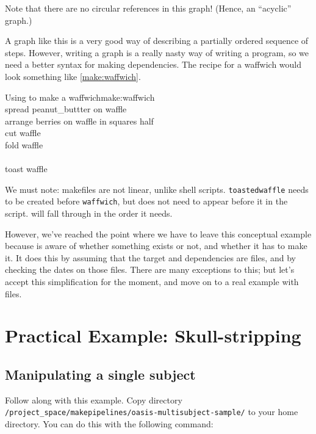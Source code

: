 Note that there are no circular references in this graph! (Hence, an ``acyclic'' graph.)

A graph like this is a very good way of describing a partially ordered sequence of steps.  However, writing a graph is a really nasty way of writing a program, so we need a better syntax for making dependencies. The \maken{} recipe for a waffwich would look something like \autoref{make:waffwich}.

\begin{make}{Using \maken{} to make a waffwich}{make:waffwich}
	 \\
	\tab	spread peanut_buttter \dd on waffle \\
	\tab arrange berries \dd on waffle \dd in squares \dd half \\
	\tab cut waffle \\ 
	\tab fold waffle \\
	
	 \\
	\tab toast waffle
\end{make}

We must note: makefiles are not linear, unlike shell scripts. \texttt{toastedwaffle} needs to be created before \texttt{waffwich}, but does not need to appear before it in the script. \maken{} will fall through in the order it needs.

However, we've reached the point where we have to leave this conceptual example because \maken{} is aware of whether something exists or not, and whether it has to make it. It does this by assuming that the target and dependencies are files, and by checking the dates on those files. There are many exceptions to this; but let's accept this simplification for the moment, and move on to a real example with files.

\section{Practical Example: Skull-stripping}

\subsection{Manipulating a single subject}

Follow along with this example. Copy directory 
\newline\texttt{/project_space/makepipelines/oasis-multisubject-sample/} 
to your home directory. You can do this with the following command:

